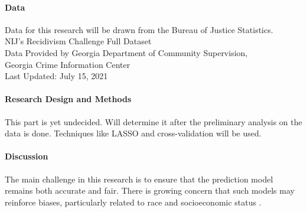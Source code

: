 \documentclass[12pt]{article}
\begin{document}
\paragraph{Data}
Data for this research will be drawn from the Bureau of Justice Statistics.\\
NIJ's Recidivism Challenge Full Dataset\\
Data Provided by Georgia Department of Community Supervision, \\Georgia Crime Information Center\\
Last Updated: July 15, 2021

\paragraph{Research Design and Methods}
This part is yet undecided. Will determine it after the preliminary analysis on the data is done. Techniques like LASSO and cross-validation will be used. 

\paragraph{Discussion}
The main challenge in this research is to ensure that the prediction model remains both accurate and fair. There is growing concern that such models may reinforce biases, particularly related to race and socioeconomic status \citep{berk2020acceptable}.



\end{document}
